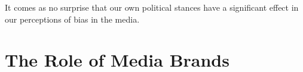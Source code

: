 It comes as no surprise that our own political stances have a significant effect in our perceptions of bias in the media. 




  

\section{The Role of Media Brands}






 









